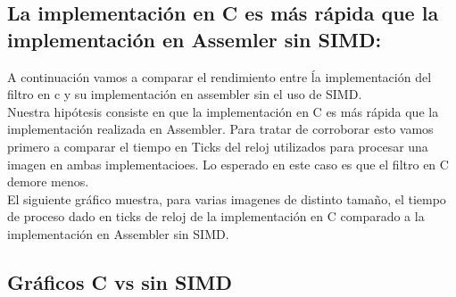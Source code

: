 \subsection{La implementación en C es más rápida que la implementación en Assemler sin SIMD:}
 A continuación vamos a comparar el rendimiento entre ĺa implementación del filtro en c y su implementación en assembler sin el uso de SIMD.\\
 Nuestra hipótesis consiste en que la implementación en C es más rápida que la implementación realizada en Assembler. Para tratar de corroborar esto vamos primero a comparar el tiempo en Ticks del reloj utilizados para procesar una imagen en ambas implementacioes.  Lo esperado en este caso es que el filtro en C demore menos. \\ 
 El siguiente gráfico muestra, para varias imagenes de distinto tamaño, el tiempo de proceso dado en ticks de reloj de la implementación en C comparado a la implementación en Assembler sin SIMD. \\

 \subsection{Gráficos C vs sin SIMD}

